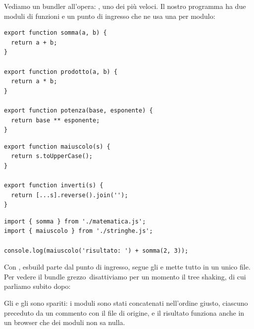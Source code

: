 Vediamo un bundler all'opera: , uno dei più veloci. Il nostro
programma ha due moduli di funzioni e un punto di ingresso che ne usa una per
modulo:

\begin{affianco}[0.5]
\begin{lstlisting}[style=js, name=src/matematica.js]
export function somma(a, b) {
  return a + b;
}

export function prodotto(a, b) {
  return a * b;
}

export function potenza(base, esponente) {
  return base ** esponente;
}
\end{lstlisting}
\risultato
\begin{lstlisting}[style=js, name=src/stringhe.js]
export function maiuscolo(s) {
  return s.toUpperCase();
}

export function inverti(s) {
  return [...s].reverse().join('');
}
\end{lstlisting}
\begin{lstlisting}[style=js, name=src/index.js]
import { somma } from './matematica.js';
import { maiuscolo } from './stringhe.js';

console.log(maiuscolo('risultato: ') + somma(2, 3));
\end{lstlisting}
\end{affianco}

Con , esbuild parte dal punto di ingresso, segue gli
 e mette tutto in un unico file. Per vedere il bundle
\guillemotleft grezzo\guillemotright\ disattiviamo per un momento il tree shaking,
di cui parliamo subito dopo:


Gli  e gli  sono spariti: i moduli sono stati
concatenati nell'ordine giusto, ciascuno preceduto da un commento con il file di
origine, e il risultato funziona anche in un browser che dei moduli non sa nulla.

